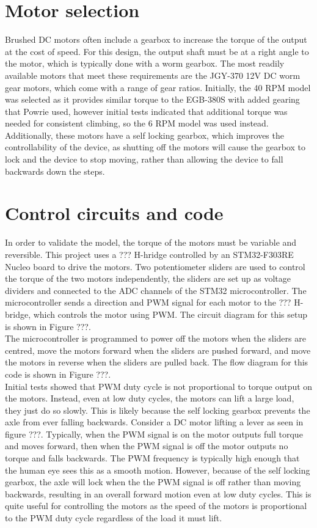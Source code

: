 \section{Motor selection}
Brushed DC motors often include a gearbox to increase the torque of the output at the cost of speed. For this design, the output shaft must be at a right angle to the motor, which is typically done with a worm gearbox. The most readily available motors that meet these requirements are the JGY-370 12V DC worm gear motors, which come with a range of gear ratios. Initially, the 40 RPM model was selected as it provides similar torque to the EGB-380S with added gearing that Powrie used, however initial tests indicated that additional torque was needed for consistent climbing, so the 6 RPM model was used instead.\\
Additionally, these motors have a self locking gearbox, which improves the controllability of the device, as shutting off the motors will cause the gearbox to lock and the device to stop moving, rather than allowing the device to fall backwards down the steps.

\section{Control circuits and code}
In order to validate the model, the torque of the motors must be variable and reversible. This project uses a ??? H-hridge controlled by an STM32-F303RE Nucleo board to drive the motors. Two potentiometer sliders are used to control the torque of the two motors independently, the sliders are set up as voltage dividers and connected to the ADC channels of the STM32 microcontroller. The microcontroller sends a direction and PWM signal for each motor to the ??? H-bridge, which controls the motor using PWM. The circuit diagram for this setup is shown in Figure ???.\\
The microcontroller is programmed to power off the motors when the sliders are centred, move the motors forward when the sliders are pushed forward, and move the motors in reverse when the sliders are pulled back. The flow diagram for this code is shown in Figure ???.\\

Initial tests showed that PWM duty cycle is not proportional to torque output on the motors. Instead, even at low duty cycles, the motors can lift a large load, they just do so slowly. This is likely because the self locking gearbox prevents the axle from ever falling backwards. Consider a DC motor lifting a lever as seen in figure ???. Typically, when the PWM signal is on the motor outputs full torque and moves forward, then when the PWM signal is off the motor outputs no torque and falls backwards. The PWM frequency is typically high enough that the human eye sees this as a smooth motion. However, because of the self locking gearbox, the axle will lock when the the PWM signal is off rather than moving backwards, resulting in an overall forward motion even at low duty cycles. This is quite useful for controlling the motors as the speed of the motors is proportional to the PWM duty cycle regardless of the load it must lift.\\

